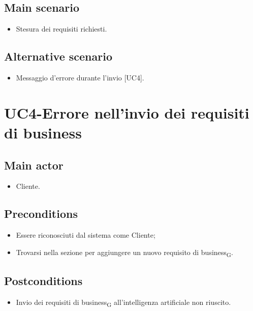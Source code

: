 \documentclass{article}
\begin{document}
     \subsection*{Main scenario}

        \begin{itemize}
            \item Stesura dei requisiti richiesti.
        \end{itemize}
     \subsection*{Alternative scenario}
        \begin{itemize}
            \item Messaggio d'errore durante l'invio [UC4].
        \end{itemize}

\section{UC4-Errore nell'invio dei requisiti di business}

     \subsection*{Main actor}
     \begin{itemize}
         \item Cliente.
     \end{itemize}
     \subsection*{Preconditions} 
     \begin{itemize}
         \item Essere riconosciuti dal sistema come Cliente;
         \item Trovarsi nella sezione per aggiungere un nuovo requisito di business\textsubscript{G}.
     \end{itemize}
     \subsection*{Postconditions} 
        \begin{itemize}
            \item Invio dei requisiti di business\textsubscript{G}  all'intelligenza artificiale non riuscito.
        \end{itemize}
\end{document}
